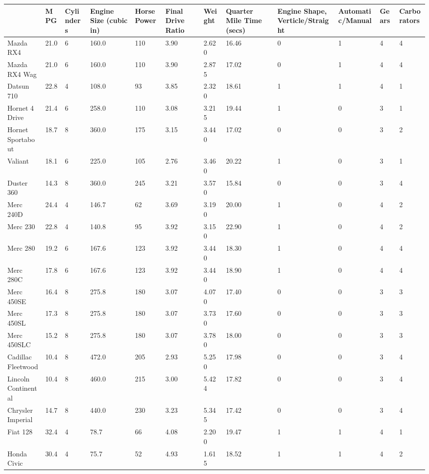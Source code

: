 \documentclass[]{book}
\theoremstyle{definition}
\theoremstyle{definition}
\theoremstyle{remark}
\begin{document}
\begin{tabular}{l|l|l|l|l|l|l|l|l|l|l|l}
\hline
  & MPG & Cylinders & Engine Size (cubic in) & Horse Power & Final Drive Ratio & Weight & Quarter Mile Time (secs) & Engine Shape, Verticle/Straight & Automatic/Manual & Gears & Carborators\\
\hline
Mazda RX4 & 21.0 & 6 & 160.0 & 110 & 3.90 & 2.620 & 16.46 & 0 & 1 & 4 & 4\\
\hline
Mazda RX4 Wag & 21.0 & 6 & 160.0 & 110 & 3.90 & 2.875 & 17.02 & 0 & 1 & 4 & 4\\
\hline
Datsun 710 & 22.8 & 4 & 108.0 & 93 & 3.85 & 2.320 & 18.61 & 1 & 1 & 4 & 1\\
\hline
Hornet 4 Drive & 21.4 & 6 & 258.0 & 110 & 3.08 & 3.215 & 19.44 & 1 & 0 & 3 & 1\\
\hline
Hornet Sportabout & 18.7 & 8 & 360.0 & 175 & 3.15 & 3.440 & 17.02 & 0 & 0 & 3 & 2\\
\hline
Valiant & 18.1 & 6 & 225.0 & 105 & 2.76 & 3.460 & 20.22 & 1 & 0 & 3 & 1\\
\hline
Duster 360 & 14.3 & 8 & 360.0 & 245 & 3.21 & 3.570 & 15.84 & 0 & 0 & 3 & 4\\
\hline
Merc 240D & 24.4 & 4 & 146.7 & 62 & 3.69 & 3.190 & 20.00 & 1 & 0 & 4 & 2\\
\hline
Merc 230 & 22.8 & 4 & 140.8 & 95 & 3.92 & 3.150 & 22.90 & 1 & 0 & 4 & 2\\
\hline
Merc 280 & 19.2 & 6 & 167.6 & 123 & 3.92 & 3.440 & 18.30 & 1 & 0 & 4 & 4\\
\hline
Merc 280C & 17.8 & 6 & 167.6 & 123 & 3.92 & 3.440 & 18.90 & 1 & 0 & 4 & 4\\
\hline
Merc 450SE & 16.4 & 8 & 275.8 & 180 & 3.07 & 4.070 & 17.40 & 0 & 0 & 3 & 3\\
\hline
Merc 450SL & 17.3 & 8 & 275.8 & 180 & 3.07 & 3.730 & 17.60 & 0 & 0 & 3 & 3\\
\hline
Merc 450SLC & 15.2 & 8 & 275.8 & 180 & 3.07 & 3.780 & 18.00 & 0 & 0 & 3 & 3\\
\hline
Cadillac Fleetwood & 10.4 & 8 & 472.0 & 205 & 2.93 & 5.250 & 17.98 & 0 & 0 & 3 & 4\\
\hline
Lincoln Continental & 10.4 & 8 & 460.0 & 215 & 3.00 & 5.424 & 17.82 & 0 & 0 & 3 & 4\\
\hline
Chrysler Imperial & 14.7 & 8 & 440.0 & 230 & 3.23 & 5.345 & 17.42 & 0 & 0 & 3 & 4\\
\hline
Fiat 128 & 32.4 & 4 & 78.7 & 66 & 4.08 & 2.200 & 19.47 & 1 & 1 & 4 & 1\\
\hline
Honda Civic & 30.4 & 4 & 75.7 & 52 & 4.93 & 1.615 & 18.52 & 1 & 1 & 4 & 2\\

\end{tabular}
\end{document}

